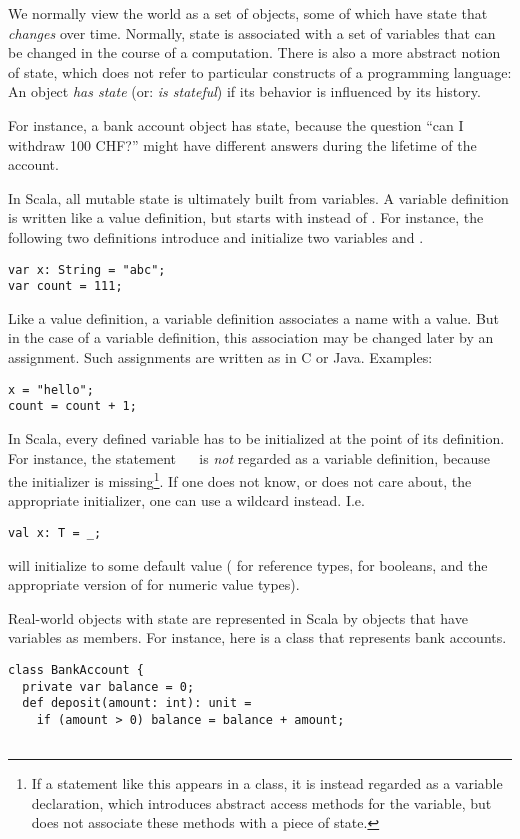 {We normally view the world as a set of objects, some of which have
state that {\em changes} over time.  Normally, state is associated
with a set of variables that can be changed in the course of a
computation.  There is also a more abstract notion of state, which
does not refer to particular constructs of a programming language: An
object {\em has state} (or: {\em is stateful}) if its behavior is
influenced by its history.

For instance, a bank account object has state, because the question
``can I withdraw 100 CHF?''
might have different answers during the lifetime of the account.

In Scala, all mutable state is ultimately built from variables.  A
variable definition is written like a value definition, but starts
with \verb@var@ instead of \verb@val@. For instance, the following two
definitions introduce and initialize two variables  and
.
\begin{lstlisting}
var x: String = "abc";
var count = 111;
\end{lstlisting}
Like a value definition, a variable definition associates a name with
a value. But in the case of a variable definition, this association
may be changed later by an assignment.  Such assignments are written
as in C or Java. Examples:
\begin{lstlisting}
x = "hello";
count = count + 1;
\end{lstlisting}
In Scala, every defined variable has to be initialized at the point of
its definition. For instance, the statement ~~ is
{\em not} regarded as a variable definition, because the initializer
is missing\footnote{If a statement like this appears in a class, it is
instead regarded as a variable declaration, which introduces
abstract access methods for the variable, but does not associate these
methods with a piece of state.}. If one does not know, or does not
care about, the appropriate initializer, one can use a wildcard
instead. I.e.
\begin{lstlisting}
val x: T = _;
\end{lstlisting}
will initialize  to some default value ( for
reference types,  for booleans, and the appropriate
version of  for numeric value types).

Real-world objects with state are represented in Scala by objects that
have variables as members. For instance, here is a class that
represents bank accounts.
\begin{lstlisting}
class BankAccount {
  private var balance = 0;
  def deposit(amount: int): unit =
    if (amount > 0) balance = balance + amount;


\end{lstlisting}}
